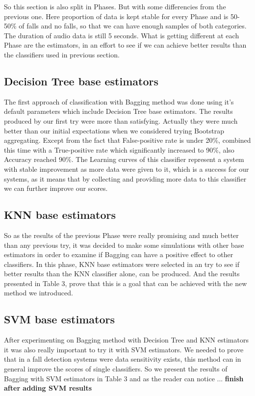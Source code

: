 \documentclass[10pt, conference, compsocconf]{IEEEtran}
\begin{document}
So this section is also split in Phases. But with some differencies from the previous one. Here proportion of data is kept stable for every Phase and is 50-50\% of falls and no falls, so that we can have enough samples of both categories. The duration of audio data is still 5 seconds. What is getting different at each Phase are the estimators, in an effort to see if we can achieve better results than the classifiers used in previous section. 

\subsection{Decision Tree base estimators}

The first approach of classification with Bagging method was done using it's default parameters which include Decision Tree base estimators. The results produced by our first try were more than satisfying. Actually they were much better than our initial expectations when we considered trying Bootstrap aggregating. Except from the fact that False-positive rate is under 20\%, combined this time with a True-positive rate which significantly increased to 90\%, also Accuracy reached 90\%. The Learning curves of this classifier represent a system with stable improvement as more data were given to it, which is a success for our systems, as it means that by collecting and providing more data to this classifier we can further improve our scores. 

\subsection{KNN base estimators} 

So as the results of the previous Phase were really promising and much better than any previous try, it was decided to make some simulations with other base estimators in order to examine if Bagging can have a positive effect to other classifiers. In this phase, KNN base estimators were selected in an try to see if better results than the KNN classifier alone, can be produced. And the results presented in Table 3, prove that this is a goal that can be achieved with the new method we introduced.   

\subsection{SVM base estimators}

After experimenting on Bagging method with Decision Tree and KNN estimators it was also really important to try it with SVM estimators. We needed to prove that in a fall detection systems were data sensitivity exists, this method can in general improve the scores of single classifiers. So we present the results of Bagging with SVM estimators in Table 3 and as the reader can notice ... {\bf finish after adding SVM results} 
\end{document}
